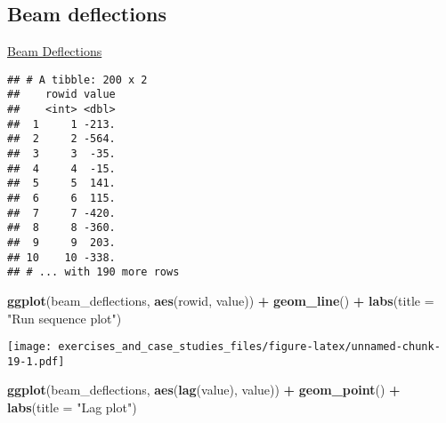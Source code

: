 \documentclass[]{book}
\newenvironment{Shaded}{\begin{snugshade}}{\end{snugshade}}
\newcommand{\DataTypeTok}[1]{\textcolor[rgb]{0.13,0.29,0.53}{#1}}
\newcommand{\DecValTok}[1]{\textcolor[rgb]{0.00,0.00,0.81}{#1}}
\newcommand{\KeywordTok}[1]{\textcolor[rgb]{0.13,0.29,0.53}{\textbf{#1}}}
\newcommand{\NormalTok}[1]{#1}
\newcommand{\OperatorTok}[1]{\textcolor[rgb]{0.81,0.36,0.00}{\textbf{#1}}}
\newcommand{\StringTok}[1]{\textcolor[rgb]{0.31,0.60,0.02}{#1}}
\theoremstyle{definition}
\theoremstyle{definition}
\theoremstyle{definition}
\theoremstyle{remark}
\begin{document}
\hypertarget{beam-deflections}{%
\subsection{Beam deflections}\label{beam-deflections}}

\href{https://www.itl.nist.gov/div898/handbook/eda/section4/eda425.htm}{Beam
Deflections}

\begin{Shaded}
\end{Shaded}

\begin{verbatim}
## # A tibble: 200 x 2
##    rowid value
##    <int> <dbl>
##  1     1 -213.
##  2     2 -564.
##  3     3  -35.
##  4     4  -15.
##  5     5  141.
##  6     6  115.
##  7     7 -420.
##  8     8 -360.
##  9     9  203.
## 10    10 -338.
## # ... with 190 more rows
\end{verbatim}

\begin{Shaded}
\begin{Highlighting}[]
\KeywordTok{ggplot}\NormalTok{(beam_deflections, }\KeywordTok{aes}\NormalTok{(rowid, value)) }\OperatorTok{+}
\StringTok{  }\KeywordTok{geom_line}\NormalTok{() }\OperatorTok{+}
\StringTok{  }\KeywordTok{labs}\NormalTok{(}\DataTypeTok{title =} \StringTok{"Run sequence plot"}\NormalTok{)}
\end{Highlighting}
\end{Shaded}

\texttt{[image: exercises\_and\_case\_studies\_files/figure-latex/unnamed-chunk-19-1.pdf]}

\begin{Shaded}
\begin{Highlighting}[]
\KeywordTok{ggplot}\NormalTok{(beam_deflections, }\KeywordTok{aes}\NormalTok{(}\KeywordTok{lag}\NormalTok{(value), value)) }\OperatorTok{+}
\StringTok{  }\KeywordTok{geom_point}\NormalTok{() }\OperatorTok{+}
\StringTok{  }\KeywordTok{labs}\NormalTok{(}\DataTypeTok{title =} \StringTok{"Lag plot"}\NormalTok{)}
\end{Highlighting}
\end{Shaded}
\end{document}
